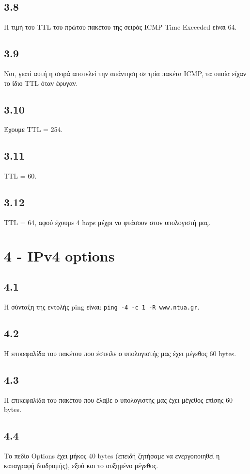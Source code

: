		\subsection*{3.8}
			Η τιμή του TTL του πρώτου πακέτου της σειράς ICMP Time Exceeded είναι 64.

		\subsection*{3.9}
			Ναι, γιατί αυτή η σειρά αποτελεί την απάντηση σε τρία πακέτα ICMP, τα οποία είχαν το ίδιο TTL όταν έφυγαν.

		\subsection*{3.10}
			Έχουμε TTL = 254.

		\subsection*{3.11}
			TTL = 60.

		\subsection*{3.12}
			TTL = 64, αφού έχουμε 4 hops μέχρι να φτάσουν στον υπολογιστή μας.

	\section*{4 - IPv4 options}
		\subsection*{4.1}
			Η σύνταξη της εντολής ping είναι: \verb|ping -4 -c 1 -R www.ntua.gr|.

		\subsection*{4.2}
			Η επικεφαλίδα του πακέτου που έστειλε ο υπολογιστής μας έχει μέγεθος 60 bytes.

		\subsection*{4.3}
			Η επικεφαλίδα του πακέτου που έλαβε ο υπολογιστής μας έχει μέγεθος επίσης 60 bytes.

		\subsection*{4.4}
			Το πεδίο Options έχει μήκος 40 bytes (επειδή ζητήσαμε να ενεργοποιηθεί η καταγραφή διαδρομής), εξού και το αυξημένο μέγεθος.

